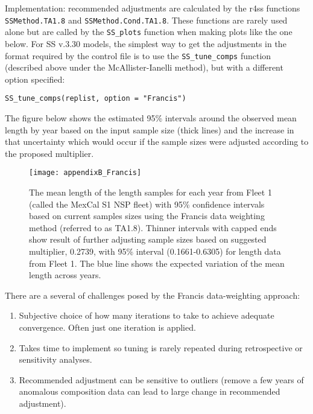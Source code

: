 
Implementation: recommended adjustments are calculated by the r4ss functions \texttt{SSMethod.TA1.8} and \texttt{SSMethod.Cond.TA1.8}. These functions are rarely used alone but are called by the \texttt{SS\_plots} function when making plots like the one below. For SS v.3.30 models, the simplest way to get the adjustments in the format required by the control file is to use the \texttt{SS\_tune\_comps} function (described above under the McAllister-Ianelli method), but with a different option specified: 

\texttt{SS\_tune\_comps(replist, option = "Francis")}

The figure below shows the estimated 95\% intervals around the observed mean length by year based on the input sample size (thick lines) and the increase in that uncertainty which would occur if the sample sizes were adjusted according to the proposed multiplier.

\begin{figure}[h]
	\begin{center}
		\texttt{[image: appendixB\_Francis]}\\
	\end{center}
	\caption{The mean length of the length samples for each year from Fleet 1 (called the MexCal S1 NSP fleet) with 95\% confidence intervals based on current samples sizes using the Francis data weighting method (referred to as TA1.8). Thinner intervals with capped ends show result of further adjusting sample sizes based on suggested multiplier, 0.2739, with 95\% interval (0.1661-0.6305) for length data from Fleet 1. The blue line shows the expected variation of the mean length across years.}
	\label{fig:francis}
\end{figure}



There are a several of challenges posed by the Francis data-weighting approach:
\begin{enumerate}
	\item Subjective choice of how many iterations to take to achieve adequate convergence. Often just one iteration is applied.
	
	\item Takes time to implement so tuning is rarely repeated during retrospective or sensitivity analyses.
	
	\item Recommended adjustment can be sensitive to outliers (remove a few years of anomalous composition data can lead to large change in recommended adjustment).
\end{enumerate}

